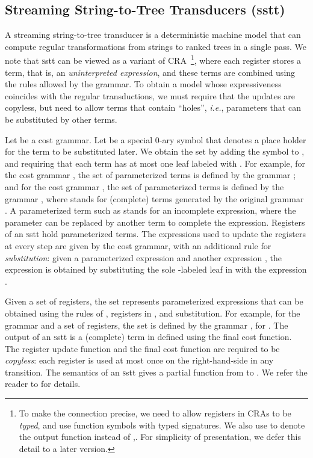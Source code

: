 \documentclass[11pt]{article}
\newcommand{\mypar}[1]{\subsection{#1}}
\newcommand{\SSTT}{{\sc\textsc sstt}\xspace}
\newcommand{\EDWA}{{CRA}\xspace}
\newcommand{\ie}{{\em i.e.}\xspace}
\begin{document}
\mypar{Streaming String-to-Tree Transducers (\SSTT)} A streaming
string-to-tree transducer is a deterministic machine model that can
compute regular transformations from strings to ranked trees in a
single pass.  We note that \SSTT can be viewed as a variant of
\EDWA~\footnote{To make the connection precise, we need to allow
registers in CRAs to be {\em typed\/}, and use function symbols with
typed signatures. We also use  to denote the output function
instead of ,. For simplicity of presentation, we defer this detail
to a later version.}, where each register stores a term, that is, an
{\em uninterpreted expression}, and these terms are combined using the
rules allowed by the grammar.  To obtain a model whose expressiveness
coincides with the regular transductions, we must require that the
updates are copyless, but need to allow terms that contain ``holes'',
\ie, parameters that can be substituted by other terms.

Let  be a cost grammar.  Let  be a special
0-ary symbol that denotes a place holder for the term to be
substituted later. We obtain the set  by adding the symbol
 to , and requiring that each term has at most one leaf
labeled with .  For example, for the cost grammar ,
the set  of parameterized terms is defined by the grammar ; and for the cost grammar , the set
 of parameterized terms is defined by the grammar , where  stands for (complete)
terms generated by the original grammar .  A
parameterized term such as  stands for an incomplete
expression, where the parameter  can be replaced by another
term to complete the expression.  Registers of an \SSTT hold
parameterized terms.  The expressions used to update the registers at
every step are given by the cost grammar, with an additional rule for
{\em substitution\/}: given a parameterized expression  and another
expression , the expression  is obtained by substituting
the sole -labeled leaf in  with the expression .

Given a set  of registers, the set
 represents parameterized expressions that
can be obtained using the rules of , registers in
, and substitution.  For example, for the grammar
 and a set  of registers, the set
 is defined by the grammar , for .  The output
of an \SSTT  is a (complete) term in  defined using the final
cost function.  The register update function and the final cost
function are required to be {\em copyless}: each register is used at
most once on the right-hand-side in any transition.  The semantics of
an \SSTT gives a partial function from  to .
We refer the reader to \cite{alur_stt_2011} for details.
\end{document}
